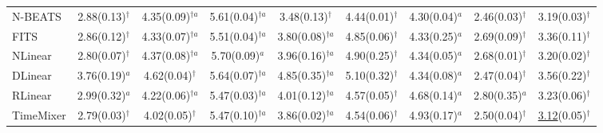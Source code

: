\begin{table}[!t]
\begin{adjustbox}{max width=\linewidth}
\begin{tabular}{lcccccccc}
N-BEATS & 2.88{\scriptsize\color{gray}(0.13)}$^{\dagger{}}$ & 4.35{\scriptsize\color{gray}(0.09)}$^{\dagger{}a}$ & 5.61{\scriptsize\color{gray}(0.04)}$^{\dagger{}a}$ & 3.48{\scriptsize\color{gray}(0.13)}$^{\dagger{}}$ & 4.44{\scriptsize\color{gray}(0.01)}$^{\dagger{}}$ & 4.30{\scriptsize\color{gray}(0.04)}$^{a}$ & 2.46{\scriptsize\color{gray}(0.03)}$^{\dagger{}}$ & 3.19{\scriptsize\color{gray}(0.03)}$^{\dagger{}}$ \\
FITS & 2.86{\scriptsize\color{gray}(0.12)}$^{\dagger{}}$ & 4.33{\scriptsize\color{gray}(0.07)}$^{\dagger{}a}$ & 5.51{\scriptsize\color{gray}(0.04)}$^{\dagger{}a}$ & 3.80{\scriptsize\color{gray}(0.08)}$^{\dagger{}a}$ & 4.85{\scriptsize\color{gray}(0.06)}$^{\dagger{}}$ & 4.33{\scriptsize\color{gray}(0.25)}$^{a}$ & 2.69{\scriptsize\color{gray}(0.09)}$^{\dagger{}}$ & 3.36{\scriptsize\color{gray}(0.11)}$^{\dagger{}}$ \\
NLinear & 2.80{\scriptsize\color{gray}(0.07)}$^{\dagger{}}$ & 4.37{\scriptsize\color{gray}(0.08)}$^{\dagger{}a}$ & 5.70{\scriptsize\color{gray}(0.09)}$^{a}$ & 3.96{\scriptsize\color{gray}(0.16)}$^{\dagger{}a}$ & 4.90{\scriptsize\color{gray}(0.25)}$^{\dagger{}}$ & 4.34{\scriptsize\color{gray}(0.05)}$^{a}$ & 2.68{\scriptsize\color{gray}(0.01)}$^{\dagger{}}$ & 3.20{\scriptsize\color{gray}(0.02)}$^{\dagger{}}$ \\
DLinear & 3.76{\scriptsize\color{gray}(0.19)}$^{a}$ & 4.62{\scriptsize\color{gray}(0.04)}$^{\dagger{}}$ & 5.64{\scriptsize\color{gray}(0.07)}$^{\dagger{}a}$ & 4.85{\scriptsize\color{gray}(0.35)}$^{\dagger{}a}$ & 5.10{\scriptsize\color{gray}(0.32)}$^{\dagger{}}$ & 4.34{\scriptsize\color{gray}(0.08)}$^{a}$ & 2.47{\scriptsize\color{gray}(0.04)}$^{\dagger{}}$ & 3.56{\scriptsize\color{gray}(0.22)}$^{\dagger{}}$ \\
RLinear & 2.99{\scriptsize\color{gray}(0.32)}$^{a}$ & 4.22{\scriptsize\color{gray}(0.06)}$^{\dagger{}a}$ & 5.47{\scriptsize\color{gray}(0.03)}$^{\dagger{}a}$ & 4.01{\scriptsize\color{gray}(0.12)}$^{\dagger{}a}$ & 4.57{\scriptsize\color{gray}(0.05)}$^{\dagger{}}$ & 4.68{\scriptsize\color{gray}(0.14)}$^{a}$ & 2.80{\scriptsize\color{gray}(0.35)}$^{a}$ & 3.23{\scriptsize\color{gray}(0.06)}$^{\dagger{}}$ \\
TimeMixer & 2.79{\scriptsize\color{gray}(0.03)}$^{\dagger{}}$ & 4.02{\scriptsize\color{gray}(0.05)}$^{\dagger{}}$ & 5.47{\scriptsize\color{gray}(0.10)}$^{\dagger{}a}$ & 3.86{\scriptsize\color{gray}(0.02)}$^{\dagger{}a}$ & 4.54{\scriptsize\color{gray}(0.06)}$^{\dagger{}}$ & 4.93{\scriptsize\color{gray}(0.17)}$^{a}$ & 2.50{\scriptsize\color{gray}(0.04)}$^{\dagger{}}$ & \underline{3.12}{\scriptsize\color{gray}(0.05)}$^{\dagger{}}$ \\

\end{tabular}
\end{adjustbox}
\end{table}
